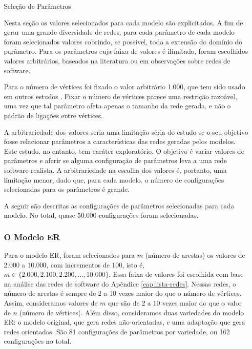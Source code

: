 \begin{section}{Seleção de Parâmetros} \label{sec:parametros}
	
	Nesta seção os valores selecionados para cada modelo são explicitados. A fim de gerar uma grande diversidade de redes, para cada parâmetro de cada modelo foram selecionados valores cobrindo, se possível, toda a extensão do domínio do parâmetro. Para os parâmetros cuja faixa de valores é ilimitada, foram escolhidos valores arbitrários, baseados na literatura ou em observações sobre redes de software. 
	
	Para o número de vértices foi fixado o valor arbitrário 1.000, que tem sido usado em outros estudos \cite{Lancichinetti2009b}. Fixar o número de vértices parece uma restrição razoável, uma vez que tal parâmetro afeta apenas o tamanho da rede gerada, e não o padrão de ligações entre vértices. 
	
	A arbitrariedade dos valores seria uma limitação séria do estudo se o seu objetivo fosse relacionar parâmetros a características das redes geradas pelos modelos. Este estudo, no entanto, tem caráter exploratório. O objetivo é variar valores de parâmetros e aferir se alguma configuração de parâmetros leva a uma rede software-realista. A arbitrariedade na escolha dos valores é, portanto, uma limitação menor, dado que, para cada modelo, o número de configurações selecionadas para os parâmetros é grande.

  A seguir são descritas as configurações de parâmetros selecionadas para cada modelo. No total, quase 50.000 configurações foram selecionadas.

\subsubsection{O Modelo ER}

Para o modelo ER, foram selecionados para $m$ (número de arestas) os valores de 2.000 a 10.000, com incrementos de 100, isto é, $m \in \{2.000, 2.100, 2.200, \ldots, 10.000\}$. Essa faixa de valores foi escolhida com base na análise das redes de software do Apêndice \ref{cap:lista-redes}. Nessas redes, o número de arestas é sempre de 2 a 10 vezes maior do que o número de vértices. Assim, consideramos valores de $m$ que são de 2 a 10 vezes maior do que o valor de $n$ (número de vértices). Além disso, consideramos duas variedades do modelo ER: o modelo original, que gera redes não-orientadas, e uma adaptação que gera redes orientadas. São 81 configurações de parâmetros por variedade, ou 162 configurações no total.


\end{section}
